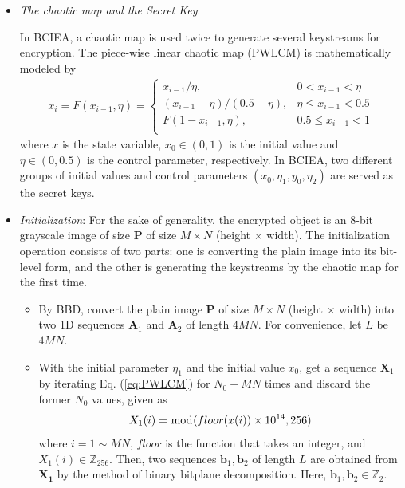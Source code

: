 \documentclass[final,3p,times]{elsarticle}
\begin{document}
\begin{itemize}
	
	\item \emph{The chaotic map and the Secret Key}:
	
	In BCIEA, a chaotic map is used twice to generate several keystreams for encryption. The piece-wise linear chaotic map (PWLCM) is mathematically modeled by
	\begin{equation}
	\begin{aligned}
	x_i = F(x_{i-1},\eta)=	\begin{cases}
	x_{i-1}/ \eta,              & 0<x_{i-1}<\eta \\
	(x_{i-1}- \eta)/(0.5-\eta), & \eta \le x_{i-1}<0.5 \\
	F(1-x_{i-1},\eta),          & 0.5 \le x_{i-1}<1 \\
	\end{cases}
	\end{aligned}
	\label{eq:PWLCM}
	\end{equation}
	where $x$ is the state variable, $x_0 \in (0,1)$ is the initial value and $\eta \in (0,0.5)$ is the control parameter, respectively. In BCIEA, two different groups of  initial values and control parameters $(x_0,\eta_1,y_0,\eta_2)$ are served as the secret keys.
	
	\item \emph{Initialization}:
	For the sake of generality, the encrypted object is an 8-bit grayscale image of size $\bm{P}$ of size $M \times N$ (height $\times$ width). The initialization operation consists of two parts: one is converting the plain image into its bit-level form, and the other is generating the keystreams by the chaotic map for the first time.
	\begin{itemize}
		\item By BBD, convert the plain image $\bm{P}$ of size $M \times N$ (height $\times$ width) into two 1D sequences $\bm{A}_1$ and $\bm{A}_2$ of length $4MN$. For convenience, let $L$ be $4MN$.
		\item With the initial parameter $\eta_1$ and the initial value $x_0$, get a sequence $\bm{X}_1$ by iterating Eq. (\ref{eq:PWLCM}) for $N_0+MN$ times and discard the former $N_0$ values, given as
		\begin{equation*}
		X_1(i) = \bmod(floor(x(i))\times 10^{14},256)\\
		\label{eq:PRNS}
		\end{equation*}
		where $i =1 \sim MN$, $floor$ is the function that takes an integer, and $X_1(i) \in \mathbb{Z}_{256}$. Then, two sequences $\bm{b}_1,\bm{b}_2$ of length $L$ are obtained from $\bm{X_1}$ by the method of binary bitplane decomposition. Here, $\bm{b}_1,\bm{b}_2 \in \mathbb{Z}_{2}$.
	\end{itemize}
	

\end{itemize}
\end{document}
